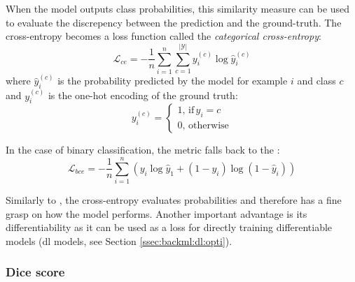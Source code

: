 When the model outputs class probabilities, this similarity measure can be used
to evaluate the discrepency between the prediction and the ground-truth. The
cross-entropy becomes a loss function called the
\textit{categorical cross-entropy}:
\begin{equation}
\label{eqn:backml:crossentropyloss}
\mathcal{L}_{ce} = - \frac{1}{n} \sum\limits_{i=1}^n \sum\limits_{c=1}^{\left|\mathcal{Y}\right|} y^{(c)}_{i} \log \hat{y}^{(c)}_i
\end{equation}
where $\hat{y}^{(c)}_i$ is the probability predicted by the model for example $i$
and class $c$ and $y^{(c)}_i$ is the one-hot encoding of the ground truth:
\begin{equation}
\label{eqn:backml:onehotencoding}
y^{(c)}_i =
\begin{cases}
1,\,\text{if}\, y_i = c \\
0,\,\text{otherwise}
\end{cases}
\end{equation}

In the case of binary classification, the metric falls back to the
:
\begin{equation}
\label{eqn:backml:bce}
\mathcal{L}_{bce} = - \frac{1}{n} \sum\limits_{i=1}^n \left(y_i \log \hat{y}_1 + (1 - y_i) \log (1 - \hat{y}_i)\right)
\end{equation}

Similarly to \rocauc, the cross-entropy evaluates probabilities and therefore has
a fine grasp on how the model performs. Another important advantage is its
differentiability as it can be used as a loss for directly training differentiable
models (\eg \acrlong{dl} models, see Section \ref{ssec:backml:dl:opti}).

\subsubsection{Dice score}
\label{sssec:backml:metric:dice}

